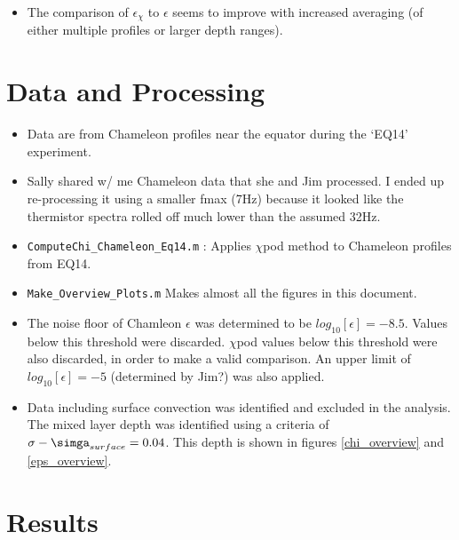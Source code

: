 \documentclass[11pt]{article}
\begin{document}
\begin{itemize}
\item The comparison of $\epsilon_{\chi}$ to $\epsilon$ seems to improve with increased averaging (of either multiple profiles or larger depth ranges). 

\end{itemize}




\clearpage
\section{Data and Processing}

\begin{itemize}

\item Data are from Chameleon profiles near the equator during the `EQ14' experiment.

\item Sally shared w/ me Chameleon data that she and Jim processed. I ended up re-processing it using a smaller fmax (7Hz) because it looked like the thermistor spectra rolled off much lower than the assumed 32Hz.

\item \verb+ComputeChi_Chameleon_Eq14.m+ : Applies $\chi$pod method to Chameleon profiles from EQ14.

\item \verb+Make_Overview_Plots.m+ Makes almost all the figures in this document.

\item The noise floor of Chamleon $\epsilon$ was determined to be $log_{10}[\epsilon]=-8.5$. Values below this threshold were discarded. $\chi$pod values below this threshold were also discarded, in order to make a valid comparison. An upper limit of $log_{10}[\epsilon]=-5$ (determined by Jim?) was also applied.

\item Data including surface convection was identified and excluded in the analysis. The mixed layer depth was identified using a criteria of $\sigma -\simga_{surface}=0.04$. This depth is shown in figures \ref{chi_overview} and \ref{eps_overview}.

\end{itemize}




\clearpage
\section{Results}
\end{document}

